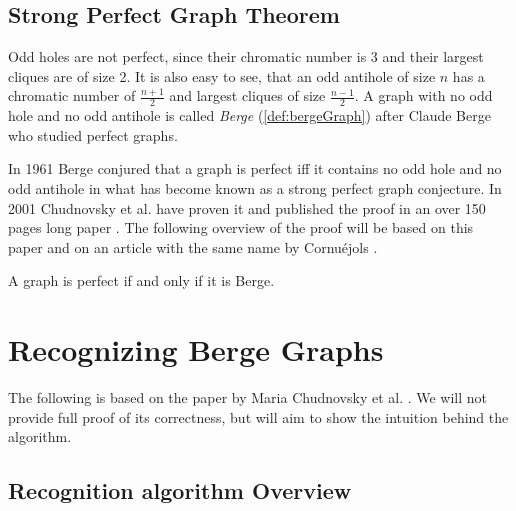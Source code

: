 \documentclass{report}
\begin{document}
\section{Strong Perfect Graph Theorem}

Odd holes are not perfect, since their chromatic number is 3 and their largest cliques are of size 2. It is also easy to see, that an odd antihole of size $n$ has a chromatic number of $\frac{n+1}{2}$ and largest cliques of size $\frac{n-1}{2}$. A graph with no odd hole and no odd antihole is called \emph{Berge} (\cref{def:bergeGraph}) after Claude Berge who studied perfect graphs.

In 1961 Berge conjured that a graph is perfect iff it contains no odd hole and no odd antihole in what has become known as a strong perfect graph conjecture. In 2001 Chudnovsky et al. have proven it and published the proof in an over 150 pages long paper  \cite{MC06}. The following overview of the proof will be based on this paper and on an article with the same name by Cornuéjols \cite{GC03}.

\begin{theorem}
	A graph is perfect if and only if it is Berge.
\end{theorem}



\chapter{Recognizing Berge Graphs}

The following is based on the paper by Maria Chudnovsky et al. . We will not provide full proof of its correctness, but will aim to show the intuition behind the algorithm.

\section{Recognition algorithm Overview}
\end{document}
